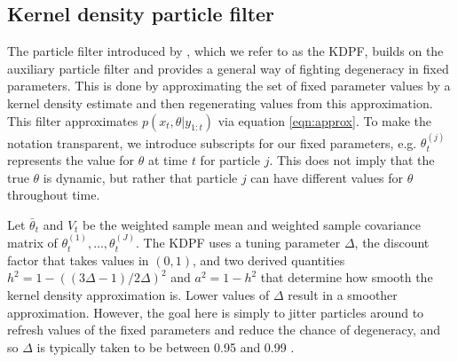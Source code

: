 \subsection{Kernel density particle filter \label{sec:kd}}

The particle filter introduced by \citet{Liu:West:comb:2001}, which we refer to as the KDPF, builds on the auxiliary particle filter and provides a general way of fighting degeneracy in fixed parameters. This is done by approximating the set of fixed parameter values by a kernel density estimate and then regenerating values from this approximation. This filter approximates $p(x_t,\theta| y_{1:t})$ via equation \eqref{eqn:approx}. To make the notation transparent, we introduce subscripts for our fixed parameters, e.g. $\theta_t^{(j)}$ represents the value for $\theta$ at time $t$ for particle $j$. This does not imply that the true $\theta$ is dynamic, but rather that particle $j$ can have different values for $\theta$ throughout time.

Let $\bar{\theta}_t$ and $V_t$ be the weighted sample mean and weighted sample covariance matrix of $\theta_t^{(1)},\ldots,\theta_t^{(J)}$.  The KDPF uses a tuning parameter $\Delta$, the discount factor that takes values in $(0,1)$, and two derived quantities $h^2 = 1 - ((3\Delta - 1)/2\Delta)^2$ and $a^2 = 1 - h^2$ that determine how smooth the kernel density approximation is. Lower values of $\Delta$ result in a smoother approximation. However, the goal here is simply to jitter particles around to refresh values of the fixed parameters and reduce the chance of degeneracy, and so $\Delta$ is typically taken to be between 0.95 and 0.99 \citep{Liu:West:comb:2001}.

